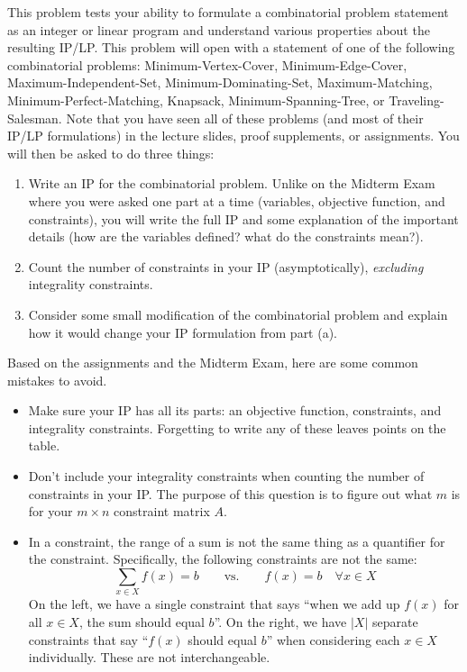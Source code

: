 \documentclass[10pt]{article}
\begin{document}
This problem tests your ability to formulate a combinatorial problem statement as an integer or linear program and understand various properties about the resulting IP/LP.
This problem will open with a statement of one of the following combinatorial problems: \textsf{Minimum-Vertex-Cover}, \textsf{Minimum-Edge-Cover}, \textsf{Maximum-Independent-Set}, \textsf{Minimum-Dominating-Set}, \textsf{Maximum-Matching}, \textsf{Minimum-Perfect-Matching}, \textsf{Knapsack}, \textsf{Minimum-Spanning-Tree}, or \textsf{Traveling-Salesman}.
Note that you have seen all of these problems (and most of their IP/LP formulations) in the lecture slides, proof supplements, or assignments.
You will then be asked to do three things:
\begin{enumerate}[label=(\alph*)]
\item Write an IP for the combinatorial problem.
Unlike on the Midterm Exam where you were asked one part at a time (variables, objective function, and constraints), you will write the full IP and some explanation of the important details (how are the variables defined? what do the constraints mean?).

\item Count the number of constraints in your IP (asymptotically), \textit{excluding} integrality constraints.

\item Consider some small modification of the combinatorial problem and explain how it would change your IP formulation from part (a).
\end{enumerate}
Based on the assignments and the Midterm Exam, here are some common mistakes to avoid.
\begin{itemize}
\item Make sure your IP has all its parts: an objective function, constraints, and integrality constraints.
Forgetting to write any of these leaves points on the table.

\item Don't include your integrality constraints when counting the number of constraints in your IP.
The purpose of this question is to figure out what $m$ is for your $m \times n$ constraint matrix $A$.

\item In a constraint, the range of a sum is not the same thing as a quantifier for the constraint.
Specifically, the following constraints are not the same:
\[\sum_{x \in X} f(x) = b \quad\quad\text{vs.}\quad\quad f(x) = b \quad \forall x \in X\]
On the left, we have a single constraint that says ``when we add up $f(x)$ for all $x \in X$, the sum should equal $b$''.
On the right, we have $|X|$ separate constraints that say ``$f(x)$ should equal $b$'' when considering each $x \in X$ individually.
These are not interchangeable.
\end{itemize}
\end{document}
